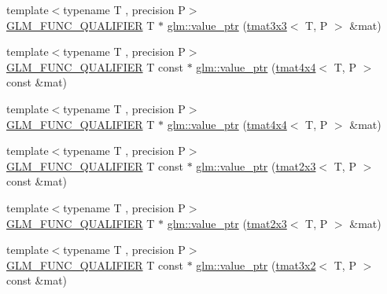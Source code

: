 \begin{DoxyCompactItemize}
\item 
{\footnotesize template$<$typename T , precision P$>$ }\\\mbox{\hyperlink{setup_8hpp_a33fdea6f91c5f834105f7415e2a64407}{G\+L\+M\+\_\+\+F\+U\+N\+C\+\_\+\+Q\+U\+A\+L\+I\+F\+I\+ER}} T $\ast$ \mbox{\hyperlink{group__gtc__type__ptr_ga4470e16d0e844cb2c4f7b2e731824f87}{glm\+::value\+\_\+ptr}} (\mbox{\hyperlink{structglm_1_1tmat3x3}{tmat3x3}}$<$ T, P $>$ \&mat)
\item 
{\footnotesize template$<$typename T , precision P$>$ }\\\mbox{\hyperlink{setup_8hpp_a33fdea6f91c5f834105f7415e2a64407}{G\+L\+M\+\_\+\+F\+U\+N\+C\+\_\+\+Q\+U\+A\+L\+I\+F\+I\+ER}} T const  $\ast$ \mbox{\hyperlink{group__gtc__type__ptr_ga2edadf5433694bf018d62db962b61321}{glm\+::value\+\_\+ptr}} (\mbox{\hyperlink{structglm_1_1tmat4x4}{tmat4x4}}$<$ T, P $>$ const \&mat)
\item 
{\footnotesize template$<$typename T , precision P$>$ }\\\mbox{\hyperlink{setup_8hpp_a33fdea6f91c5f834105f7415e2a64407}{G\+L\+M\+\_\+\+F\+U\+N\+C\+\_\+\+Q\+U\+A\+L\+I\+F\+I\+ER}} T $\ast$ \mbox{\hyperlink{group__gtc__type__ptr_ga1fc49ab60e5afdd4821a6903e92244a4}{glm\+::value\+\_\+ptr}} (\mbox{\hyperlink{structglm_1_1tmat4x4}{tmat4x4}}$<$ T, P $>$ \&mat)
\item 
{\footnotesize template$<$typename T , precision P$>$ }\\\mbox{\hyperlink{setup_8hpp_a33fdea6f91c5f834105f7415e2a64407}{G\+L\+M\+\_\+\+F\+U\+N\+C\+\_\+\+Q\+U\+A\+L\+I\+F\+I\+ER}} T const  $\ast$ \mbox{\hyperlink{group__gtc__type__ptr_ga968f2c8899914ea1c1daaaded8daa6b5}{glm\+::value\+\_\+ptr}} (\mbox{\hyperlink{structglm_1_1tmat2x3}{tmat2x3}}$<$ T, P $>$ const \&mat)
\item 
{\footnotesize template$<$typename T , precision P$>$ }\\\mbox{\hyperlink{setup_8hpp_a33fdea6f91c5f834105f7415e2a64407}{G\+L\+M\+\_\+\+F\+U\+N\+C\+\_\+\+Q\+U\+A\+L\+I\+F\+I\+ER}} T $\ast$ \mbox{\hyperlink{group__gtc__type__ptr_ga36fb9a17664c8b6848a5d005e4068a2f}{glm\+::value\+\_\+ptr}} (\mbox{\hyperlink{structglm_1_1tmat2x3}{tmat2x3}}$<$ T, P $>$ \&mat)
\item 
{\footnotesize template$<$typename T , precision P$>$ }\\\mbox{\hyperlink{setup_8hpp_a33fdea6f91c5f834105f7415e2a64407}{G\+L\+M\+\_\+\+F\+U\+N\+C\+\_\+\+Q\+U\+A\+L\+I\+F\+I\+ER}} T const  $\ast$ \mbox{\hyperlink{group__gtc__type__ptr_ga398202d6ce304deb7da50badde85ee41}{glm\+::value\+\_\+ptr}} (\mbox{\hyperlink{structglm_1_1tmat3x2}{tmat3x2}}$<$ T, P $>$ const \&mat)

\end{DoxyCompactItemize}
